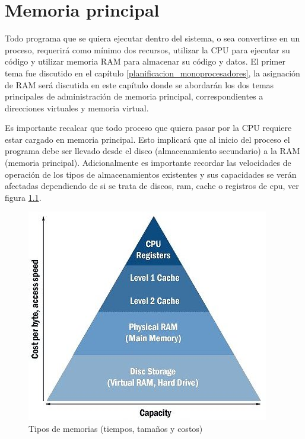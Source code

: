 %
%
%
%

\chapter{Memoria principal}
\label{memoria_principal}
Todo programa que se quiera ejecutar dentro del sistema, o sea convertirse en un proceso, requerirá como mínimo dos recursos, utilizar la CPU para ejecutar su código y utilizar memoria RAM para almacenar su código y datos. El primer tema fue discutido en el capítulo \ref{planificacion_monoprocesadores}, la asignación de RAM será discutida en este capítulo donde se abordarán los dos temas principales de administración de memoria principal, correspondientes a direcciones virtuales y memoria virtual.

Es importante recalcar que todo proceso que quiera pasar por la CPU requiere estar cargado en memoria principal. Esto implicará que al inicio del proceso el programa debe ser llevado desde el disco (almacenamiento secundario) a la RAM (memoria principal). Adicionalmente es importante recordar las velocidades de operación de los tipos de almacenamientos existentes y sus capacidades se verán afectadas dependiendo de si se trata de discos, ram, cache o registros de cpu, ver figura \ref{fig:memchart}.

\begin{figure}[htbp]
\centering
\includegraphics[scale=0.7]{img/C07_memoria/memchart.jpg}
\caption{Tipos de memorias (tiempos, tamaños y costos)}
\label{fig:memchart}
\end{figure}

